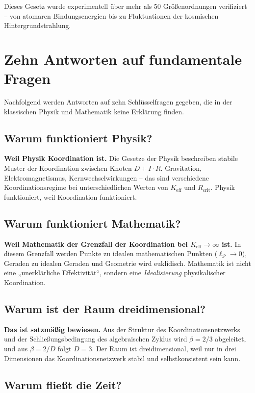\documentclass[12pt,a4paper]{article}
\newcommand{\Keff}{K_{\mathrm{eff}}}
\newcommand{\betaf}{\beta}
\newcommand{\Rcrit}{R_{\mathrm{crit}}}
\newcommand{\calP}{\mathcal{P}}
\begin{document}
	Dieses Gesetz wurde experimentell über mehr als 50 Größenordnungen verifiziert – von atomaren Bindungsenergien bis zu Fluktuationen der kosmischen Hintergrundstrahlung.
	
	\section{Zehn Antworten auf fundamentale Fragen}
	
	Nachfolgend werden Antworten auf zehn Schlüsselfragen gegeben, die in der klassischen Physik und Mathematik keine Erklärung finden.
	
	\subsection{Warum funktioniert Physik?}
	
	\textbf{Weil Physik Koordination ist.} Die Gesetze der Physik beschreiben stabile Muster der Koordination zwischen Knoten \(D+I\cdot R\). Gravitation, Elektromagnetismus, Kernwechselwirkungen – das sind verschiedene Koordinationsregime bei unterschiedlichen Werten von \(\Keff\) und \(\Rcrit\). Physik funktioniert, weil Koordination funktioniert.
	
	\subsection{Warum funktioniert Mathematik?}
	
	\textbf{Weil Mathematik der Grenzfall der Koordination bei \(\Keff \to \infty\) ist.} In diesem Grenzfall werden Punkte zu idealen mathematischen Punkten (\(\ell_{\calP} \to 0\)), Geraden zu idealen Geraden und Geometrie wird euklidisch. Mathematik ist nicht eine „unerklärliche Effektivität“, sondern eine \emph{Idealisierung} physikalischer Koordination.
	
	\subsection{Warum ist der Raum dreidimensional?}
	
	\textbf{Das ist satzmäßig bewiesen.} Aus der Struktur des Koordinationsnetzwerks und der Schließungsbedingung des algebraischen Zyklus wird \(\betaf = 2/3\) abgeleitet, und aus \(\betaf = 2/D\) folgt \(D=3\). Der Raum ist dreidimensional, weil nur in drei Dimensionen das Koordinationsnetzwerk stabil und selbstkonsistent sein kann.
	
	\subsection{Warum fließt die Zeit?}
	
\end{document}
